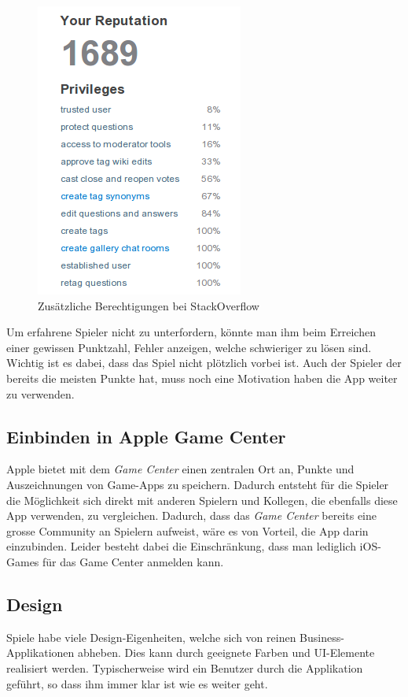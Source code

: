 \begin{figure}[H]
	\centering
	\includegraphics[scale=0.7]{images/gamification/so-privileges}
	\caption{Zusätzliche Berechtigungen bei StackOverflow}
	\label{gamification-so-privileges}
\end{figure}

Um erfahrene Spieler nicht zu unterfordern, könnte man ihm beim Erreichen einer gewissen Punktzahl, Fehler anzeigen, welche schwieriger zu lösen sind.
Wichtig ist es dabei, dass das Spiel nicht plötzlich vorbei ist.
Auch der Spieler der bereits die meisten Punkte hat, muss noch eine Motivation haben die App weiter zu verwenden.

\subsection{Einbinden in Apple Game Center}
Apple bietet mit dem \emph{Game Center} einen zentralen Ort an, Punkte und Auszeichnungen von Game-Apps zu speichern.
Dadurch entsteht für die Spieler die Möglichkeit sich direkt mit anderen Spielern und Kollegen, die ebenfalls diese App verwenden, zu vergleichen.
Dadurch, dass das \emph{Game Center} bereits eine grosse Community an Spielern aufweist, wäre es von Vorteil, die App darin einzubinden.
Leider besteht dabei die Einschränkung, dass man lediglich iOS-Games für das Game Center anmelden kann.

\subsection{Design}
Spiele habe viele Design-Eigenheiten, welche sich von reinen Business-Applikationen abheben.
Dies kann durch geeignete Farben und UI-Elemente realisiert werden.
Typischerweise wird ein Benutzer durch die Applikation geführt, so dass ihm immer klar ist wie es weiter geht.


